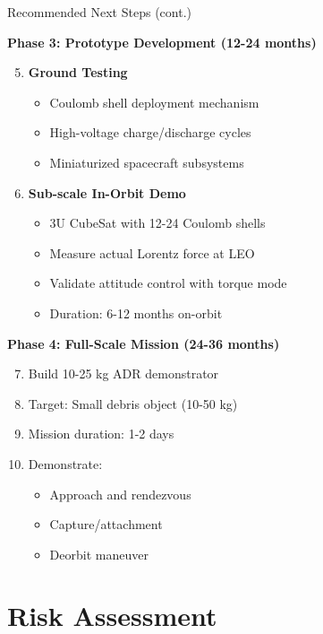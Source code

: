 \documentclass[11pt]{beamer}
\begin{document}
\begin{frame}{Recommended Next Steps (cont.)}

\textbf{Phase 3: Prototype Development (12-24 months)}
\begin{enumerate}
\setcounter{enumi}{4}
\item \textbf{Ground Testing}
\begin{itemize}
\item Coulomb shell deployment mechanism
\item High-voltage charge/discharge cycles
\item Miniaturized spacecraft subsystems
\end{itemize}

\item \textbf{Sub-scale In-Orbit Demo}
\begin{itemize}
\item 3U CubeSat with 12-24 Coulomb shells
\item Measure actual Lorentz force at LEO
\item Validate attitude control with torque mode
\item Duration: 6-12 months on-orbit
\end{itemize}
\end{enumerate}

\vspace{0.2cm}

\textbf{Phase 4: Full-Scale Mission (24-36 months)}
\begin{enumerate}
\setcounter{enumi}{6}
\item Build 10-25 kg ADR demonstrator
\item Target: Small debris object (10-50 kg)
\item Mission duration: 1-2 days
\item Demonstrate:
\begin{itemize}
\item Approach and rendezvous
\item Capture/attachment
\item Deorbit maneuver
\end{itemize}
\end{enumerate}

\end{frame}

\section{Risk Assessment}
\end{document}
